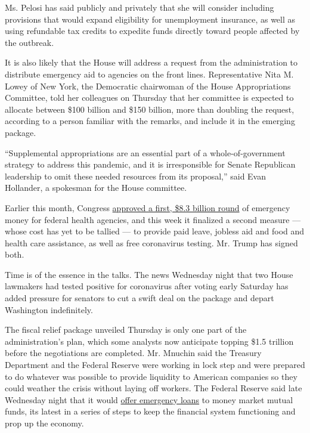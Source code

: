 Ms. Pelosi has said publicly and privately that she will consider
including provisions that would expand eligibility for unemployment
insurance, as well as using refundable tax credits to expedite funds
directly toward people affected by the outbreak.

It is also likely that the House will address a request from the
administration to distribute emergency aid to agencies on the front
lines. Representative Nita M. Lowey of New York, the Democratic
chairwoman of the House Appropriations Committee, told her colleagues on
Thursday that her committee is expected to allocate between \$100
billion and \$150 billion, more than doubling the request, according to
a person familiar with the remarks, and include it in the emerging
package.

``Supplemental appropriations are an essential part of a
whole-of-government strategy to address this pandemic, and it is
irresponsible for Senate Republican leadership to omit these needed
resources from its proposal,'' said Evan Hollander, a spokesman for the
House committee.

Earlier this month, Congress
\href{https://www.nytimes3xbfgragh.onion/2020/03/04/us/politics/coronavirus-emergency-aid-congress.html}{approved
a first, \$8.3 billion round} of emergency money for federal health
agencies, and this week it finalized a second measure --- whose cost has
yet to be tallied --- to provide paid leave, jobless aid and food and
health care assistance, as well as free coronavirus testing. Mr. Trump
has signed both.

Time is of the essence in the talks. The news Wednesday night that two
House lawmakers had tested positive for coronavirus after voting early
Saturday has added pressure for senators to cut a swift deal on the
package and depart Washington indefinitely.

The fiscal relief package unveiled Thursday is only one part of the
administration's plan, which some analysts now anticipate topping \$1.5
trillion before the negotiations are completed. Mr. Mnuchin said the
Treasury Department and the Federal Reserve were working in lock step
and were prepared to do whatever was possible to provide liquidity to
American companies so they could weather the crisis without laying off
workers. The Federal Reserve said late Wednesday night that it would
\href{https://www.nytimes3xbfgragh.onion/2020/03/18/business/federal-reserve-mutual-funds-coronavirus-aid.html}{offer
emergency loans} to money market mutual funds, its latest in a series of
steps to keep the financial system functioning and prop up the economy.

